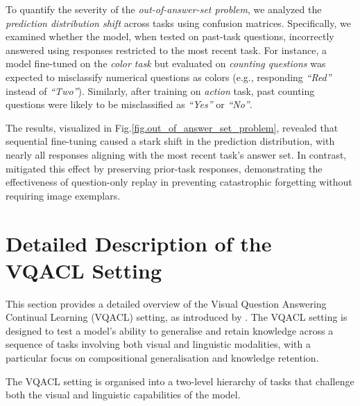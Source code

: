 To quantify the severity of the \textit{out-of-answer-set problem}, we analyzed the \textit{prediction distribution shift} across tasks using confusion matrices. Specifically, we examined whether the model, when tested on past-task questions, incorrectly answered using responses restricted to the most recent task. For instance, a model fine-tuned on the \textit{color task} but evaluated on \textit{counting questions} was expected to misclassify numerical questions as colors (e.g., responding \textit{``Red''} instead of \textit{``Two''}). Similarly, after training on \textit{action} task, past counting questions were likely to be misclassified as \textit{``Yes''} or \textit{``No''}.

The results, visualized in Fig.\ref{fig.out_of_answer_set_problem}, revealed that sequential fine-tuning caused a stark shift in the prediction distribution, with nearly all responses aligning with the most recent task’s answer set. In contrast, \qstmethodshort{} mitigated this effect by preserving prior-task responses, demonstrating the effectiveness of question-only replay in preventing catastrophic forgetting without requiring image exemplars.

\section{Detailed Description of the VQACL Setting}
\label{sec:details_setting}

This section provides a detailed overview of the Visual Question Answering Continual Learning (VQACL) setting, as introduced by \cite{zhang2023vqacl}. The VQACL setting is designed to test a model's ability to generalise and retain knowledge across a sequence of tasks involving both visual and linguistic modalities, with a particular focus on compositional generalisation and knowledge retention.

The VQACL setting is organised into a two-level hierarchy of tasks that challenge both the visual and linguistic capabilities of the model.

